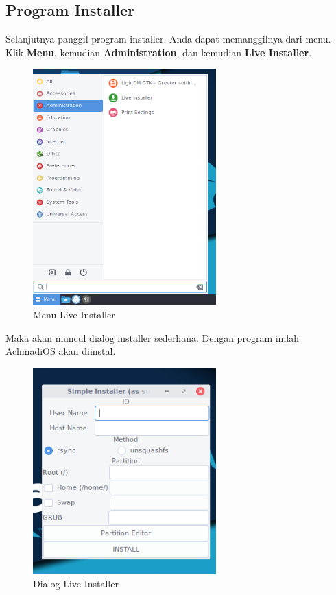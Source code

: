 \documentclass[12pt,]{article}
\begin{document}
	\newpage
	\subsection{Program Installer}
	Selanjutnya panggil program installer.
	Anda dapat memanggilnya dari menu.
	Klik \textbf{Menu}, kemudian \textbf{Administration}, dan kemudian \textbf{Live Installer}. 
	
	\begin{figure}[h]
		\centering
		\includegraphics[width=200pt]{installhdd/step_4}
		\caption{Menu Live Installer}
	\end{figure}

	Maka akan muncul dialog installer sederhana.
	Dengan program inilah AchmadiOS akan diinstal.
	
	\begin{figure}[h]
		\centering
		\includegraphics[width=200pt]{installhdd/step_5}
		\caption{Dialog Live Installer}
	\end{figure}   
	
\end{document}
